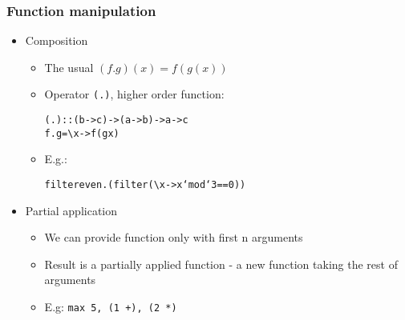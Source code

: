 \documentclass[final,handout]{beamer}
\begin{document}
\begin{frame}[fragile]
    \frametitle{Function manipulation}

    \begin{itemize}
        \item<1-> Composition
            \begin{itemize}
                \item The usual $(f.g)(x) = f(g(x))$
                \item<2-> Operator \texttt{(.)}, higher order function:
                    \begin{alltt}
    (.) :: (b -> c) -> (a -> b) -> a -> c
    f . g = \textbackslash x -> f (g x)
                    \end{alltt}
                \item<3-> E.g.:
                    \begin{alltt}
    filter even . (filter (\textbackslash x -> x `mod` 3 == 0))  
                    \end{alltt}
            \end{itemize}
        \item<4-> Partial application
            \begin{itemize}
                \item We can provide function only with first n arguments
                \item Result is a partially applied function - a new function
                    taking the rest of arguments
                \item<5-> E.g: \texttt{max 5, (1 +), (2 *)}
            \end{itemize}
    \end{itemize}
\end{frame}
\end{document}
